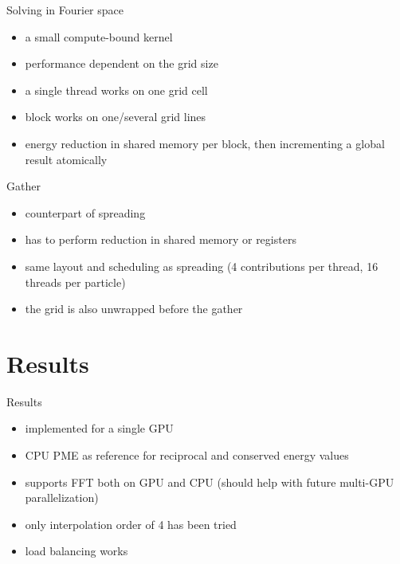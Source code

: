 \documentclass[11pt]{beamer}
\begin{document}
\begin{frame}{Solving in Fourier space}
\begin{itemize}
\item a small compute-bound kernel
\item performance dependent on the grid size
\item a single thread works on one grid cell
\item block works on one/several grid lines
\item energy reduction in shared memory per block, then incrementing a global result atomically
\end{itemize}
\end{frame}

\begin{frame}{Gather}
\begin{itemize}
\item counterpart of spreading
\item has to perform reduction in shared memory or registers
\item same layout and scheduling as spreading (4 contributions per thread, 16 threads per particle)
\item the grid is also unwrapped before the gather
\end{itemize}
\end{frame}

\section{Results}
\begin{frame}{Results}
\begin{itemize}
\item implemented for a single GPU
\item CPU PME as reference for reciprocal and conserved energy values
\item supports FFT both on GPU and CPU (should help with future multi-GPU parallelization) 
\item only interpolation order of 4 has been tried
\item load balancing works
\end{itemize}
\end{frame}
\end{document}
